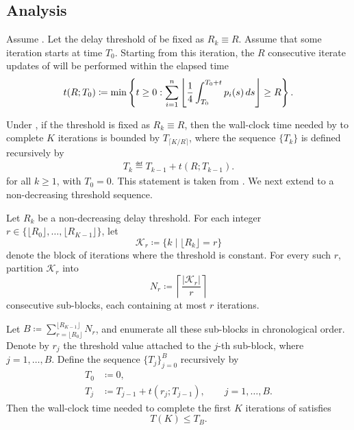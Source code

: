 \documentclass{article}
\begin{document}
\subsection{Analysis}
% 
% 
\begin{lemma}
    \label{lem:time_R_arbitrary}
    Assume .
    Let the delay threshold of  be fixed as $R_k \equiv R$.
    Assume that some iteration starts at time $T_0$.
    Starting from this iteration, the $R$ consecutive iterate updates of  will be performed within the elapsed time
    \begin{equation*} 
           t(R;T_0) \coloneqq \min \left\{t \geq 0 : \sum \limits_{i=1}^{n} \left\lfloor \frac{1}{4} \int_{T_0}^{T_0 + t} p_i(s)\, ds\right\rfloor \geq R\right\}.
    \end{equation*}
\end{lemma}
% 
Under , if the threshold is fixed as $R_k \equiv R$, then the wall-clock time needed by  to complete $K$ iterations is bounded by $T_{\lceil K/R \rceil}$, where the sequence $\{T_k\}$ is defined recursively by
\begin{align*}
    T_k \eqdef T_{k-1} + t(R;T_{k-1}) .
\end{align*}
for all $k \geq 1$, with $T_0 = 0$.
This statement is taken from \citet{maranjyan2025ringmaster}.
% 
We next extend  to a non-decreasing threshold sequence.
% 
\begin{lemma}
    \label{lem:time_RK_arbitrary}
    Let $R_k$ be a non-decreasing delay threshold.
    For each integer $r \in \{\lfloor R_0 \rfloor, \dots, \lfloor R_{K-1} \rfloor\}$, let
    $$
        \mathcal{K}_r \coloneqq \{k \mid \lfloor R_k \rfloor = r\}
    $$
    denote the block of iterations where the threshold is constant.
    For every such $r$, partition $\mathcal{K}_r$ into
    $$
        N_r \coloneqq \left\lceil \frac{|\mathcal{K}_r|}{r} \right\rceil
    $$
    consecutive sub-blocks, each containing at most $r$ iterations.

    Let $B \coloneqq \sum_{r=\lfloor R_0 \rfloor}^{\lfloor R_{K-1} \rfloor} N_r$, and enumerate all these sub-blocks in chronological order.
    Denote by $r_j$ the threshold value attached to the $j$-th sub-block, where $j = 1, \dots, B$.
    Define the sequence $\{T_j\}_{j=0}^{B}$ recursively by
    \begin{align*}
        T_0 &\coloneqq 0, \\
        T_j &\coloneqq T_{j-1} + t(r_j; T_{j-1}), \qquad j = 1, \dots, B.
    \end{align*}
    Then the wall-clock time needed to complete the first $K$ iterations of  satisfies
    \begin{equation*}
        T(K) \le T_B.
    \end{equation*}
\end{lemma}
\end{document}

